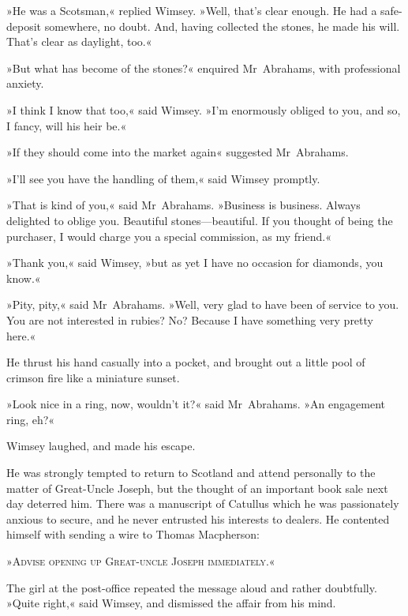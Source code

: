 »He was a Scotsman,« replied Wimsey. »Well, that's clear enough. He had a safe-deposit somewhere, no doubt. And, having collected the stones, he made his will. That's clear as daylight, too.«

»But what has become of the stones?« enquired Mr~Abrahams, with professional anxiety.

»I think I know that too,« said Wimsey. »I'm enormously obliged to you, and so, I fancy, will his heir be.«

»If they should come into the market again\longdash« suggested Mr~Abrahams.

»I'll see you have the handling of them,« said Wimsey promptly.

»That is kind of you,« said Mr~Abrahams. »Business is business. Always delighted to oblige you. Beautiful stones—beautiful. If you thought of being the purchaser, I would charge you a special commission, as my friend.«

»Thank you,« said Wimsey, »but as yet I have no occasion for diamonds, you know.«

»Pity, pity,« said Mr~Abrahams. »Well, very glad to have been of service to you. You are not interested in rubies? No? Because I have something very pretty here.«

He thrust his hand casually into a pocket, and brought out a little pool of crimson fire like a miniature sunset.

»Look nice in a ring, now, wouldn't it?« said Mr~Abrahams. »An engagement ring, eh?«

Wimsey laughed, and made his escape.

He was strongly tempted to return to Scotland and attend personally to the matter of Great-Uncle Joseph, but the thought of an important book sale next day deterred him. There was a manuscript of Catullus which he was passionately anxious to secure, and he never entrusted his interests to dealers. He contented himself with sending a wire to Thomas Macpherson:

»\textsc{Advise opening up Great-uncle Joseph immediately.}«

The girl at the post-office repeated the message aloud and rather doubtfully. »Quite right,« said Wimsey, and dismissed the affair from his mind.

